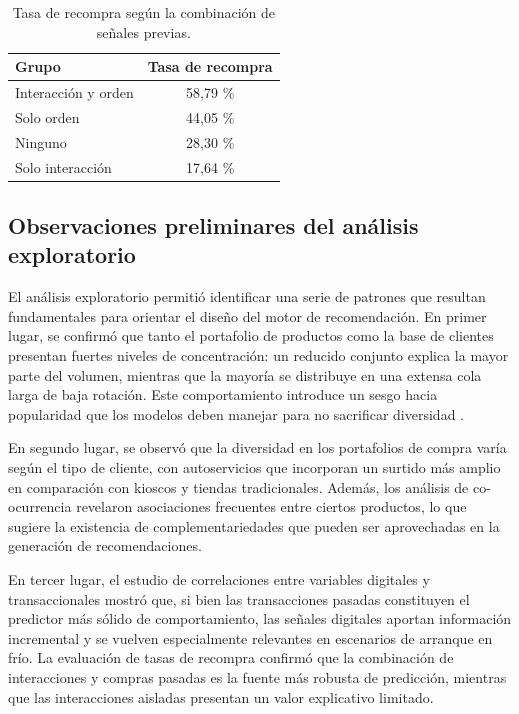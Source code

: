\begin{table}[h]
	\centering
	\caption[Tasa de recompra por combinación de señales]{Tasa de recompra según la combinación de señales previas.}
	\begin{tabular}{l c}    
		\toprule
		\textbf{Grupo}     & \textbf{Tasa de recompra}\\
		\midrule
		Interacción y orden & 58{,}79 \% \\
		Solo orden & 44{,}05 \% \\
		Ninguno & 28{,}30 \% \\
		Solo interacción & 17{,}64 \% \\
		\bottomrule
	\end{tabular}
	\label{tab:tasa_recompra}
\end{table}

\subsection{Observaciones preliminares del análisis exploratorio}

El análisis exploratorio permitió identificar una serie de patrones que resultan fundamentales para orientar el diseño del motor de recomendación. En primer lugar, se confirmó que tanto el portafolio de productos como la base de clientes presentan fuertes niveles de concentración: un reducido conjunto explica la mayor parte del volumen, mientras que la mayoría se distribuye en una extensa cola larga de baja rotación. Este comportamiento introduce un sesgo hacia popularidad que los modelos deben manejar para no sacrificar diversidad \cite{BOOK:Anderson2006}.

En segundo lugar, se observó que la diversidad en los portafolios de compra varía según el tipo de cliente, con autoservicios que incorporan un surtido más amplio en comparación con kioscos y tiendas tradicionales. Además, los análisis de co-ocurrencia revelaron asociaciones frecuentes entre ciertos productos, lo que sugiere la existencia de complementariedades que pueden ser aprovechadas en la generación de recomendaciones.  

En tercer lugar, el estudio de correlaciones entre variables digitales y transaccionales mostró que, si bien las transacciones pasadas constituyen el predictor más sólido de comportamiento, las señales digitales aportan información incremental y se vuelven especialmente relevantes en escenarios de arranque en frío. La evaluación de tasas de recompra confirmó que la combinación de interacciones y compras pasadas es la fuente más robusta de predicción, mientras que las interacciones aisladas presentan un valor explicativo limitado.  

